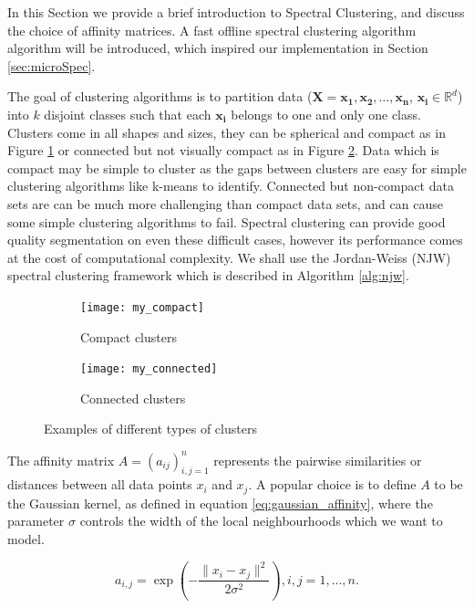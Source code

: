 In this Section we provide a brief introduction to Spectral Clustering, and discuss the choice of affinity matrices. A fast offline spectral clustering algorithm \cite{Yan2009} algorithm will be introduced, which inspired our implementation in Section \ref{sec:microSpec}.

The goal of clustering algorithms is to partition data ($\boldsymbol{X} =\boldsymbol{ x_1}, \boldsymbol{x_2}, \hdots, \boldsymbol{x_n}$, $\boldsymbol{x_i} \in \mathbb{R}^d$) into $k$ disjoint classes such that each $\boldsymbol{x_i} $ belongs to one and only one class. Clusters come in all shapes and sizes, they can be spherical and compact as in Figure \ref{fig:compact} or connected but not visually compact as in Figure \ref{fig:connected}. Data which is compact may be simple to cluster as the gaps between clusters are easy for simple clustering algorithms like k-means to identify. Connected but non-compact data sets are can be much more challenging than compact data sets, and can cause some simple clustering algorithms to fail. Spectral clustering can provide good quality segmentation on even these difficult cases, however its performance comes at the cost of computational complexity. We shall use the Jordan-Weiss (NJW) spectral clustering framework \cite{Ng2001} which is described in Algorithm \ref{alg:njw}. 

\begin{figure}[h!]
  \centering

  \begin{subfigure}{0.4\textwidth}
    \centering
    \texttt{[image: my\_compact]}
    \caption{Compact clusters}
  \label{fig:compact}
  \end{subfigure}
  \begin{subfigure}{0.4\textwidth}
    \centering
    \texttt{[image: my\_connected]}
     \caption{Connected clusters}
     \label{fig:connected}
     \end{subfigure}
  \caption{Examples of different types of clusters}
  \label{fig:compact_connected}
\end{figure}

The affinity matrix $A = (a_{ij} )_{i,j = 1}^n$ represents the pairwise similarities or distances between all data points $x_i$ and $x_j$. A popular choice is to define $A$ to be the Gaussian kernel, as defined in equation \eqref{eq:gaussian_affinity}, where the parameter $\sigma$ controls the width of the local neighbourhoods which we want to model.

\begin{equation}
  \label{eq:gaussian_affinity}
    a_{i,j} = \exp  \left( - \frac{\| x_i - x_j \|^2}{2 \sigma^2} \right), i, j = 1, \ldots, n.
\end{equation}

